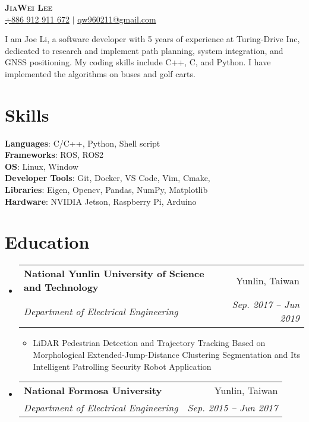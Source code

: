 \documentclass[letterpaper,11pt]{article}
\makeatletter
\newcommand{\resumeItem}[1]{
  \item\small{
    {#1 \vspace{-2pt}}
  }
}
\newcommand{\resumeSubheading}[4]{
  \vspace{-2pt}\item
    \begin{tabular*}{0.97\textwidth}[t]{l@{\extracolsep{\fill}}r}
      \textbf{#1} & #2 \\
      \textit{\small#3} & \textit{\small #4} \\
    \end{tabular*}\vspace{-7pt}
}
\newcommand{\resumeSubHeadingListStart}{\begin{itemize}[leftmargin=0.15in, label={}]}
\newcommand{\resumeSubHeadingListEnd}{\end{itemize}}
\newcommand{\resumeItemListStart}{\begin{itemize}}
\newcommand{\resumeItemListEnd}{\end{itemize}\vspace{-5pt}}
\makeatother
\begin{document}
\begin{center}
    \textbf{\Huge \scshape JiaWei Lee} \\ \vspace{3pt}
    \faMobile \hspace{.5pt} \href{tel:0912911672}{\color{blue}+886 912 911 672} $|$
    \faAt \hspace{.5pt} \href{mailto:qw960211@gmail.com}{\color{blue}qw960211@gmail.com}
\end{center}

{I am Joe Li, a software developer with 5 years of experience at Turing-Drive Inc, dedicated to research and implement path planning, system integration, and GNSS positioning. My coding skills include C++, C, and Python. I have implemented the algorithms on buses and golf carts.} \\

\section{\textbf{Skills}}
 \begin{itemize}[leftmargin=0.15in, label={}]
    \small{\item{
     \textbf{Languages}{: C/C++, Python, Shell script} \\
     \textbf{Frameworks}{: ROS, ROS2} \\
     \textbf{OS}{: Linux, Window} \\
     \textbf{Developer Tools}{: Git, Docker, VS Code, Vim, Cmake, } \\
     \textbf{Libraries}{: Eigen, Opencv, Pandas, NumPy, Matplotlib} \\
     \textbf{Hardware}{: NVIDIA Jetson, Raspberry Pi, Arduino}
    }}
 \end{itemize}

\section{\textbf{Education}}
  \vspace{3pt}
  \resumeSubHeadingListStart
    \resumeSubheading
      {National Yunlin University of  Science and Technology}{Yunlin, Taiwan}
      {Department of Electrical Engineering}{Sep. 2017 -- Jun 2019}
      \resumeItemListStart
        \resumeItem{LiDAR Pedestrian Detection and Trajectory Tracking Based on Morphological Extended-Jump-Distance  Clustering Segmentation and Its Intelligent Patrolling  Security Robot Application}
      \resumeItemListEnd
    \resumeSubheading
      {National Formosa University}{Yunlin, Taiwan}
      {Department of Electrical Engineering}{Sep. 2015 -- Jun 2017}
  \resumeSubHeadingListEnd
\end{document}
